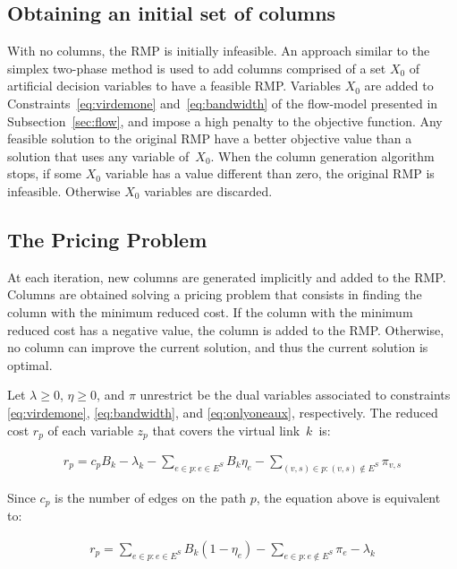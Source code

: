 \documentclass[conference]{IEEEtran}
\begin{document}
\subsection{Obtaining an initial set of columns}
\label{sec:initcol}
With no columns, the RMP is initially infeasible. %
An approach similar to the simplex two-phase method is used to add columns comprised of a set $X_0$ of artificial decision variables to have a feasible RMP. Variables $X_0$ are added to Constraints~\eqref{eq:virdemone} and~\eqref{eq:bandwidth} of the flow-model presented in Subsection~\ref{sec:flow}, and impose a high penalty to the objective function. %
Any feasible solution to the original RMP have a better objective value than a solution that uses any variable of~$X_0$. 
When the column generation algorithm stops, if some $X_0$ variable has a value different than zero, the original RMP is infeasible. Otherwise $X_0$ variables are discarded.

\subsection{The Pricing Problem}
\label{sec:pricing}
At each iteration, new columns are generated implicitly and added to the RMP.
Columns are obtained solving a pricing problem that consists in finding the column with the minimum reduced cost.
If the column with the minimum reduced cost has a negative value, the column is added to the RMP. Otherwise, no column can improve the current solution, and thus the current solution is optimal.

Let $\lambda \geq 0$, $\eta \geq 0$, and  $\pi$ unrestrict be the dual variables associated to constraints \eqref{eq:virdemone}, \eqref{eq:bandwidth}, and \eqref{eq:onlyoneaux}, respectively. The reduced cost $r_{p}$ of each variable $z_{p}$ that covers the virtual link~$k$~is:

\begin{align}
  r_{p} = c_{p} B_{k} - \lambda_{k} - \sum\limits_{e \in p : e \in E^S} B_{k} \eta_{e}  - \sum\limits_{(v,s) \in p : (v,s) \notin E^S} \pi_{v,s}  \nonumber
\end{align}

Since $c_p$ is the number of edges on the path $p$, the equation above is equivalent to:

\begin{align}
  r_{p} = \sum\limits_{e \in p : e \in E^S} B_{k} (1 - \eta_{e}) - \sum\limits_{e \in p : e \notin E^S} \pi_e - \lambda_{k} \nonumber
\end{align}
\end{document}
